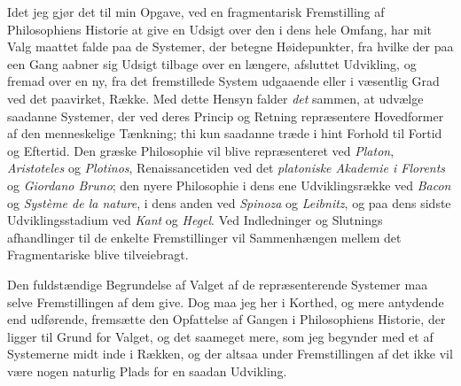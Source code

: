 \documentclass[12pt,a4paper]{book}
\newcommand{\opage}[1]{\marginnote{\footnotesize\textit{[#1]}}}
\begin{document}
Idet jeg gjør det til min Opgave, ved en fragmentarisk Fremstilling
af Philosophiens Historie at give en Udsigt over den i dens hele
Omfang, har mit Valg maattet falde paa de Systemer, der betegne
Høidepunkter, fra hvilke der paa een Gang aabner sig Udsigt tilbage
over en længere, afsluttet Udvikling, og fremad over en ny, fra det
fremstillede System udgaaende eller i væsentlig Grad ved det
paavirket, Række. Med dette Hensyn falder \emph{det} sammen, at
udvælge saadanne Systemer, der ved deres Princip og Retning
repræsentere Hovedformer af den menneskelige Tænkning; thi kun
saadanne træde i hint Forhold til Fortid og Eftertid. Den græske
Philosophie vil blive repræsenteret ved \emph{Platon},
\emph{Aristoteles} og \emph{Plotinos}, Renaissancetiden ved det
\emph{platoniske Akademie i Florents} og \emph{Giordano Bruno}; den
nyere Philosophie i dens ene Udviklingsrække ved \emph{Bacon} og
\emph{Système de la nature}, i dens anden ved \emph{Spinoza} og
\emph{Leibnitz}, og paa dens sidste Udviklingsstadium ved \emph{Kant}
og \emph{Hegel}. Ved Indledninger og Slutnings\-%
\opage{3}afhandlinger til de enkelte Fremstillinger vil Sammenhængen mellem det
Fragmentariske blive tilveiebragt.

Den fuldstændige Begrundelse af Valget af de repræsenterende Systemer
maa selve Fremstillingen af dem give. Dog maa jeg her i Korthed, og
mere antydende end udførende, fremsætte den Opfattelse af Gangen i
Philosophiens Historie, der ligger til Grund for Valget, og det
saameget mere, som jeg begynder med et af Systemerne midt inde i
Rækken, og der altsaa under Fremstillingen af det ikke vil være nogen
naturlig Plads for en saadan Udvikling.
\end{document}
